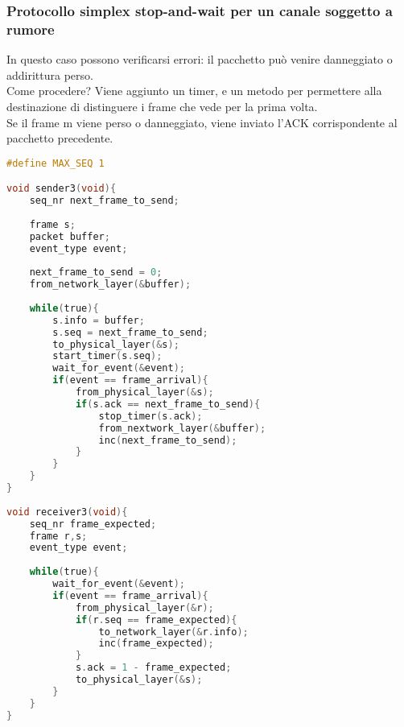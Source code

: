 \documentclass{article}
\begin{document}
\subsubsection{Protocollo simplex stop-and-wait per un canale soggetto a rumore}
In questo caso possono verificarsi errori: il pacchetto può venire danneggiato o addirittura perso. \\
Come procedere? Viene aggiunto un timer, e un metodo per permettere alla destinazione di distinguere i frame che vede per la prima volta. \\
Se il frame m viene perso o danneggiato, viene inviato l'ACK corrispondente al pacchetto precedente. 
\begin{lstlisting}[language=C, caption=simplex stop-and-wait con canale con errori]
#define MAX_SEQ 1

void sender3(void){
	seq_nr next_frame_to_send;	
	
	frame s;
	packet buffer;
	event_type event;
	
	next_frame_to_send = 0;
	from_network_layer(&buffer);
	
	while(true){
		s.info = buffer;
		s.seq = next_frame_to_send;
		to_physical_layer(&s);
		start_timer(s.seq);
		wait_for_event(&event);
		if(event == frame_arrival){
			from_physical_layer(&s);
			if(s.ack == next_frame_to_send){
				stop_timer(s.ack);
				from_nextwork_layer(&buffer);
				inc(next_frame_to_send);
			}
		}
	}
}
	
void receiver3(void){
	seq_nr frame_expected;
	frame r,s;
	event_type event;
	
	while(true){
		wait_for_event(&event);
		if(event == frame_arrival){
			from_physical_layer(&r);
			if(r.seq == frame_expected){		
				to_network_layer(&r.info);
				inc(frame_expected);
			}
			s.ack = 1 - frame_expected;
			to_physical_layer(&s);
		}
	}
}
\end{lstlisting}
\end{document}
